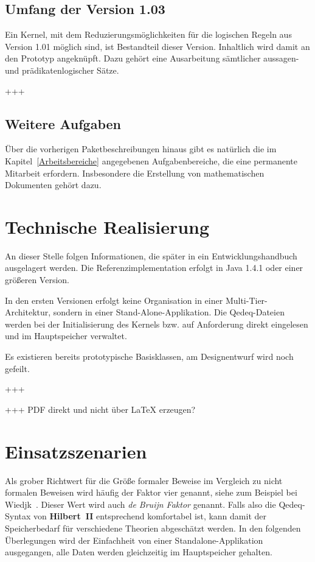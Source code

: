 \documentclass[a4paper,german,10pt,twoside]{book}
\begin{document}
{\section{Umfang der Version 1.03}
Ein Kernel, mit dem Reduzierungsm{\"o}glichkeiten f{\"u}r die logischen Regeln aus Version 1.01 m{\"o}glich
sind, ist Bestandteil dieser Version. Inhaltlich wird damit an den Prototyp angekn{\"u}pft. Dazu geh{\"o}rt
eine Ausarbeitung s{\"a}mtlicher aussagen- und pr{\"a}dikatenlogischer S{\"a}tze.
\par
+++

\section{Weitere Aufgaben}
{\"U}ber die vorherigen Paketbeschreibungen hinaus gibt es nat{\"u}rlich die im
Kapitel~\ref{Arbeitsbereiche} angegebenen Aufgabenbereiche, die eine permanente Mitarbeit
erfordern. Insbesondere die Erstellung von mathematischen Dokumenten geh{\"o}rt dazu.


\chapter{Technische Realisierung} \label{Technische_Realisierung}

An dieser Stelle folgen Informationen, die sp{\"a}ter in ein
Entwicklungshandbuch ausgelagert werden. Die Referenzimplementation
erfolgt in Java 1.4.1 oder einer gr{\"o}{\ss}eren Version.
\par
In den ersten Versionen erfolgt keine Organisation in einer Multi-Tier-Architektur, sondern in
einer Stand-Alone-Applikation. Die Qedeq-Dateien werden bei der Initialisierung des Kernels bzw.
auf Anforderung direkt eingelesen und im Hauptspeicher verwaltet.
\par
Es existieren bereits prototypische Basisklassen, am Designentwurf wird noch gefeilt.
\par
+++
\par
+++ PDF direkt und nicht {\"u}ber \LaTeX{} erzeugen? \\


\chapter{Einsatzszenarien} \label{Einsatzszenarien}

Als grober Richtwert f{\"u}r die Gr{\"o}{\ss}e formaler Beweise im Vergleich zu nicht formalen Beweisen wird
h{\"a}ufig der Faktor vier genannt, siehe zum Beispiel bei Wiedjk~\cite{wiedijk}. Dieser Wert wird auch
\emph{de Bruijn Faktor} genannt. Falls also die
Qedeq-Syntax von \textbf{Hilbert~II} entsprechend komfortabel ist, kann damit der Speicherbedarf
f{\"u}r verschiedene Theorien abgesch{\"a}tzt werden. In den folgenden {\"U}berlegungen wird der Einfachheit
von einer Standalone-Applikation ausgegangen, alle Daten werden gleichzeitig im Hauptspeicher
gehalten.

}
\end{document}
